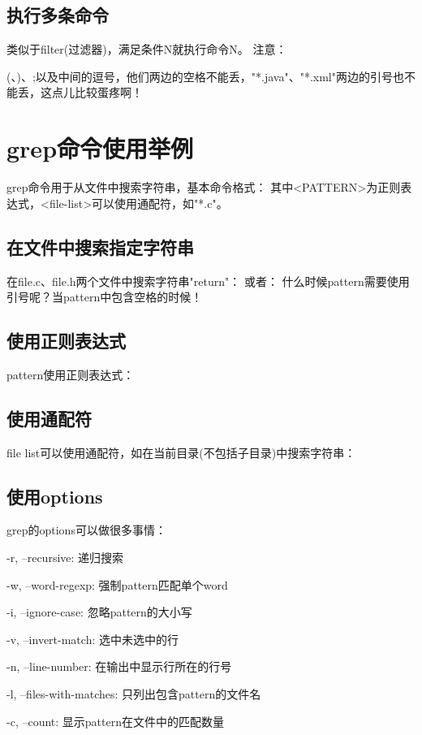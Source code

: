 ﻿\documentclass[a4paper,11pt]{article}
\begin{document}
  \subsection[执行多条命令]{执行多条命令}
  类似于filter(过滤器)，满足条件N就执行命令N。
  注意：\par
  \bs(、\bs)、\bs;以及中间的逗号，他们两边的空格不能丢，"*.java"、"*.xml"两边的引号也不能丢，这点儿比较蛋疼啊！


  \section[grep命令使用举例]{grep命令使用举例}
  grep命令用于从文件中搜索字符串，基本命令格式：
  其中<PATTERN>为正则表达式，<file-list>可以使用通配符，如"*.c"。

  \subsection[在文件中搜索指定字符串]{在文件中搜索指定字符串}
  在file.c、file.h两个文件中搜索字符串"return"：
  或者：
  什么时候pattern需要使用引号呢？当pattern中包含空格的时候！

  \subsection[使用正则表达式]{使用正则表达式}
  pattern使用正则表达式：

  \subsection[使用通配符]{使用通配符}
  file list可以使用通配符，如在当前目录(不包括子目录)中搜索字符串：

  \subsection[使用options]{使用options}
  grep的options可以做很多事情：
  \begin{coloredenumerate}
    \item -r, --recursive: 递归搜索
    \item -w, --word-regexp: 强制pattern匹配单个word
    \item -i, --ignore-case: 忽略pattern的大小写
    \item -v, --invert-match: 选中未选中的行
    \item -n, --line-number: 在输出中显示行所在的行号
    \item -l, --files-with-matches: 只列出包含pattern的文件名
    \item -c, --count: 显示pattern在文件中的匹配数量
  \end{coloredenumerate}
\end{document}
